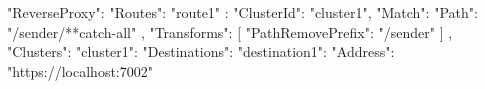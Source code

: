 \begin{spverbatim}
    "ReverseProxy": {
        "Routes": {
            "route1" : {
                "ClusterId": "cluster1",
                "Match": {
                    "Path": "/sender/{**catch-all}"
                },
                "Transforms": [
                    {
                    "PathRemovePrefix": "/sender"
                }
                ]
            }
        },
        "Clusters": {
            "cluster1": {
                "Destinations": {
                    "destination1": {
                        "Address": "https://localhost:7002"
                    }
                }
            }
        }
    }
\end{spverbatim}